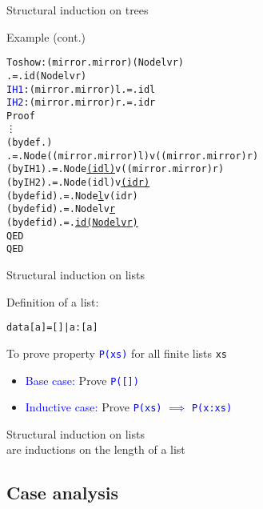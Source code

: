 \documentclass{beamer}
\def\code#1{\texttt{\frenchspacing#1}}
\begin{document}
\begin{frame}[fragile]{Structural induction on trees}

\begin{exampleblock}{Example (cont.)}
\small\begin{alltt}
  To show: (mirror . mirror) (Node l v r)
           .=. id (Node l v r)
  \textcolor{blue}{IH1}:     (mirror . mirror) l .=. id l
  \textcolor{blue}{IH2}:     (mirror . mirror) r .=. id r
  Proof
    \vdots
    (by def .)
    .=. Node ((mirror . mirror) l) v ((mirror . mirror) r)\pause
    (by IH1)    .=. Node \underline{(id l)} v ((mirror . mirror) r)
    (by IH2)    .=. Node (id l) v \underline{(id r)}\pause
    (by def id) .=. Node \underline{l} v (id r)\pause
    (by def id) .=. Node l v \underline{r}\pause
    (by def id) .=. \underline{id (Node l v r)}
  QED
QED
\end{alltt}\normalsize
\end{exampleblock}

\end{frame}

\begin{frame}{Structural induction on lists}

Definition of a list:\pause
\begin{alltt}
data [a] = [] | a : [a]
\end{alltt}

\pause

To prove property \textcolor{blue}{\code{P(xs)}} for all finite lists \code{xs} \par
\begin{itemize}
    \item \textcolor{blue}{Base case:} Prove \textcolor{blue}{\code{P([])}} \par
    \item \textcolor{blue}{Inductive case:} Prove \textcolor{blue}{\code{P(xs)} $\implies$ \code{P(x:xs)}}
\end{itemize}

\pause

\vspace{1cm}
\begin{block}{\centering Structural induction on lists \\ are inductions on the length of a list}
\end{block}

\end{frame}

\subsection{Case analysis}
\end{document}
